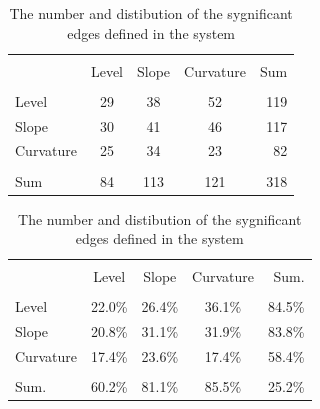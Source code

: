 \documentclass[12pt,bibliography=totoc]{article}
\begin{document}
\begin{table}[H]

\fontsize{9}{9}\selectfont
\centering
\begin{subtable}[t]{0.35\textwidth}
\centering
\begin{tabular}{l | ccc  r}%
\hline\hline \\ [-1.5ex]                         %

	&	Level 	&	Slope	&	Curvature	& Sum  \\ 
\hline \\ [-1.5ex]  
Level	&	29	&	38	&	52	&	119 	\\
Slope	&	30	&	41	&	46	&	117	\\
Curvature	&	25	&	34	&	23	&	82	\\
\hline \\ [-1.5ex]  
Sum	&	84	&	113	&	121	&	318	\\


\hline            
\end{tabular}
\caption{\textbf{Number of edges, grouped by factors}}
\end{subtable}
\hspace{\fill}
\begin{subtable}[t]{0.5\textwidth}
\centering
\begin{tabular}{l | ccc  r}%
\hline\hline \\ [-1.5ex]                         %



	&	Level	&	Slope	&	Curvature	&	Sum.	\\
\hline \\ [-1.5ex] 
Level	&	22.0\%	&	26.4\%	&	36.1\%	&	84.5\%	\\
Slope	&	20.8\%	&	31.1\%	&	31.9\%	&	83.8\%	\\
Curvature	&17.4\%	&	23.6\%	&	17.4\%	&	58.4\%	\\
\hline \\ [-1.5ex]  
Sum.	&	60.2\%	&	81.1\%	&	85.5\%	&	25.2\%	\\
\hline  
\end{tabular}
\caption{\textbf{Distribution of edges, grouped by factors}}
\end{subtable}
\caption{The number and distibution of the sygnificant edges defined in the system} %
\end{table}
\end{document}
